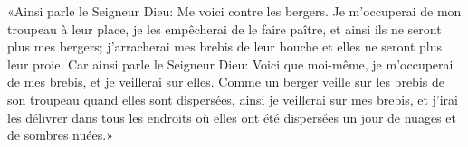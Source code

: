 «Ainsi parle le Seigneur Dieu: Me voici contre les bergers.
Je m’occuperai de mon troupeau à leur place, je les empêcherai de le faire paître,
	et ainsi ils ne seront plus mes bergers;
	j’arracherai mes brebis de leur bouche et elles ne seront plus leur proie.
Car ainsi parle le Seigneur Dieu:
	Voici que moi-même, je m’occuperai de mes brebis, et je veillerai sur elles.
Comme un berger veille sur les brebis de son troupeau quand elles sont dispersées,
	ainsi je veillerai sur mes brebis,
	et j’irai les délivrer dans tous les endroits où elles ont été dispersées
		un jour de nuages et de sombres nuées.»
